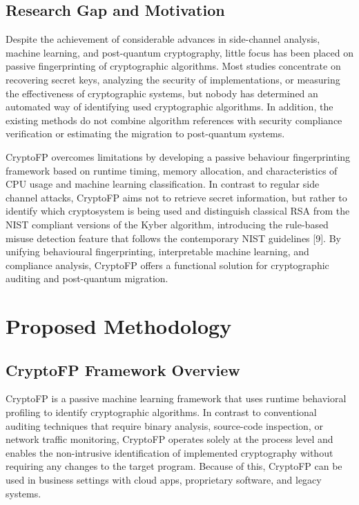 \documentclass[conference]{IEEEtran}
\begin{document}
\subsection{Research Gap and Motivation}

Despite the achievement of considerable advances in side-channel analysis, machine learning, and post-quantum cryptography, little focus has been placed on passive fingerprinting of cryptographic algorithms. Most studies concentrate on recovering secret keys, analyzing the security of implementations, or measuring the effectiveness of cryptographic systems, but nobody has determined an automated way of identifying used cryptographic algorithms. In addition, the existing methods do not combine algorithm references with security compliance verification or estimating the migration to post-quantum systems.

CryptoFP overcomes limitations by developing a passive behaviour fingerprinting framework based on runtime timing, memory allocation, and characteristics of CPU usage and machine learning classification. In contrast to regular side channel attacks, CryptoFP aims not to retrieve secret information, but rather to identify which cryptosystem is being used and distinguish classical RSA from the NIST compliant versions of the Kyber algorithm, introducing the rule-based misuse detection feature that follows the contemporary NIST guidelines [9]. By unifying behavioural fingerprinting, interpretable machine learning, and compliance analysis, CryptoFP offers a functional solution for cryptographic auditing and post-quantum migration.

\section{Proposed Methodology}
\subsection{CryptoFP Framework Overview}
CryptoFP is a passive machine learning framework that uses runtime behavioral profiling to identify cryptographic algorithms. In contrast to conventional auditing techniques that require binary analysis, source-code inspection, or network traffic monitoring, CryptoFP operates solely at the process level and enables the non-intrusive identification of implemented cryptography without requiring any changes to the target program. Because of this, CryptoFP can be used in business settings with cloud apps, proprietary software, and legacy systems.
\end{document}
